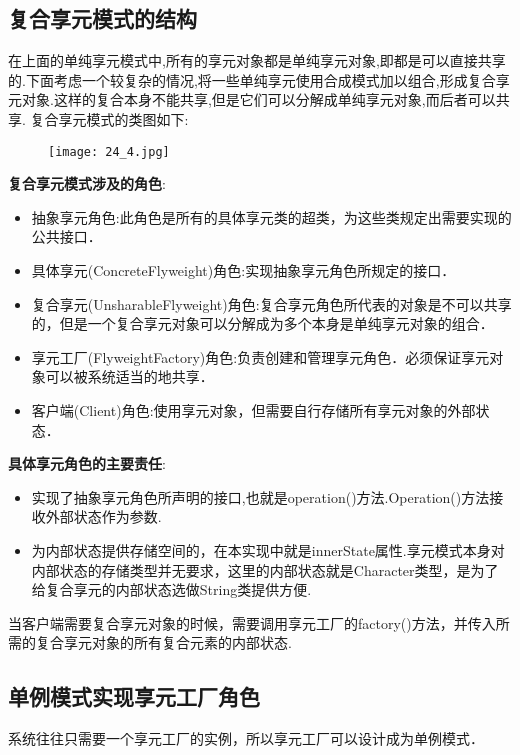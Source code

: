 \documentclass[../main.tex]{subfiles}
\begin{document}
\subsection{复合享元模式的结构}
在上面的单纯享元模式中,所有的享元对象都是单纯享元对象,即都是可以直接共享的.下面考虑一个较复杂的情况,将一些单纯享元使用合成模式加以组合,形成复合享元对象.这样的复合本身不能共享,但是它们可以分解成单纯享元对象,而后者可以共享.
复合享元模式的类图如下:
%
\begin{figure}[H]
  \texttt{[image: 24\_4.jpg]}
\end{figure}
%
\textbf{复合享元模式涉及的角色}:
\begin{itemize}
  \item 抽象享元角色:此角色是所有的具体享元类的超类，为这些类规定出需要实现的公共接口．
  \item 具体享元(ConcreteFlyweight)角色:实现抽象享元角色所规定的接口．
  \item 复合享元(UnsharableFlyweight)角色:复合享元角色所代表的对象是不可以共享的，但是一个复合享元对象可以分解成为多个本身是单纯享元对象的组合．
  \item 享元工厂(FlyweightFactory)角色:负责创建和管理享元角色．必须保证享元对象可以被系统适当的地共享．
  \item 客户端(Client)角色:使用享元对象，但需要自行存储所有享元对象的外部状态．
\end{itemize}
%

%
\textbf{具体享元角色的主要责任}:
\begin{itemize}
  \item 实现了抽象享元角色所声明的接口,也就是operation()方法.Operation()方法接收外部状态作为参数.
  \item 为内部状态提供存储空间的，在本实现中就是innerState属性.享元模式本身对内部状态的存储类型并无要求，这里的内部状态就是Character类型，是为了给复合享元的内部状态选做String类提供方便.
\end{itemize}
%

%

%
当客户端需要复合享元对象的时候，需要调用享元工厂的factory()方法，并传入所需的复合享元对象的所有复合元素的内部状态.

%
\subsection{单例模式实现享元工厂角色}
系统往往只需要一个享元工厂的实例，所以享元工厂可以设计成为单例模式．
\end{document}
